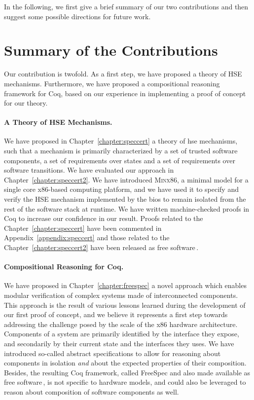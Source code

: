 In the following, we first give a brief summary of our two contributions and
then suggest some possible directions for future work.

\section{Summary of the Contributions}
\label{sec:conclusion:summary}

Our contribution is twofold.
%
As a first step, we have proposed a theory of HSE mechanisms.
%
Furthermore, we have proposed a compositional reasoning framework for Coq, based
on our experience in implementing a proof of concept for our theory.

\paragraph{A Theory of HSE Mechanisms.}
%
We have proposed in Chapter~\ref{chapter:speccert} a theory of \ac{hse}
mechanisms, such that a mechanism is primarily characterized by a set of trusted
software components, a set of requirements over states and a set of requirements
over software transitions.
%
We have evaluated our approach in Chapter~\ref{chapter:speccert2}.
%
We have introduced {\scshape Minx86}, a minimal model for a single core
x86-based computing platform, and we have used it to specify and verify the HSE
mechanism implemented by the \ac{bios} to remain isolated from the rest of the
software stack at runtime.
%
We have written machine-checked proofs in Coq to increase our confidence in our
result.
%
Proofs related to the Chapter~\ref{chapter:speccert} have been commented in
Appendix~\ref{appendix:speccert} and those related to the
Chapter~\ref{chapter:speccert2} have been released as free
software\,\cite{letan2016speccertcode}.

\paragraph{Compositional Reasoning for Coq.}
%
We have proposed in Chapter~\ref{chapter:freespec} a novel approach which
enables modular verification of complex systems made of interconnected
components.
%
This approach is the result of various lessons learned during the development of
our first proof of concept, and we believe it represents a first step towards
addressing the challenge posed by the scale of the x86 hardware architecture.
%
Components of a system are primarily identified by the interface they expose,
and secondarily by their current state and the interfaces they uses.
%
We have introduced so-called abstract specifications to allow for reasoning
about components in isolation \emph{and} about the expected properties of their
composition.
%
Besides, the resulting Coq framework, called FreeSpec and also made available as
free software\,\cite{letan2018freespeccode}, is not specific to hardware models,
and could also be leveraged to reason about composition of software components
as well.


